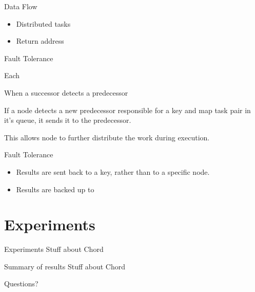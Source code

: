\documentclass[11pt]{beamer}
\begin{document}
\begin{frame}{Data Flow}
\begin{itemize}
	\item Distributed tasks
	\item Return address
\end{itemize}
 
\end{frame}


\begin{frame}{Fault Tolerance}
	\item Each
	\item When a successor detects a predecessor  
	\item If a node detects a new predecessor responsible for a key and map task pair in it's queue, it sends it to the predecessor.
	\item This allows node to further distribute the work during execution.

\end{frame}



\begin{frame}{Fault Tolerance}
\begin{itemize}
	\item Results are sent back to a key, rather than to a specific node.
	\item Results are backed up to 
\end{itemize}
\end{frame}



\section{Experiments}


\begin{frame}{Experiments}
Stuff about Chord
\end{frame}

\begin{frame}{Summary of results}
Stuff about Chord
\end{frame}


\begin{frame}
Questions?
\end{frame}



\end{document}
